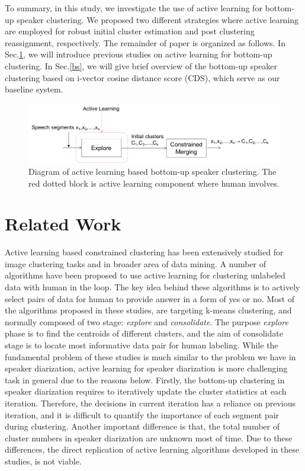 \documentclass[journal]{IEEEtran}
\begin{document}
To summary, in this study, we investigate the use of active learning for bottom-up speaker clustering. We proposed two different strategies where active learning are employed for robust initial cluster estimation and post clustering reassignment, respectively. The remainder of paper is organized as follows. In Sec.\ref{rw}, we will introduce previous studies on active learning for bottom-up clustering. In Sec.\ref{bs}, we will give brief overview of the bottom-up speaker clustering based on i-vector cosine distance score (CDS), which serve as our baseline system.   

\begin{figure}
	\includegraphics[width=\linewidth]{figs/flow5}
	\caption{Diagram of active learning based bottom-up speaker clustering. The red dotted block is active learning component where human involves.}
	\label{fig:flow1}
\end{figure}

\section{Related Work}
\label{rw}
Active learning based constrained clustering has been extensively studied for image clustering tasks and in broader area of data mining. A number of algorithms have been proposed to use active learning for clustering unlabeled data with human in the loop. The key idea behind these algorithms is to actively select pairs of data for human to provide answer in a form of yes or no. 
Most of the algorithms proposed in these studies, are targeting k-means clustering, and normally composed of two stage: \textit{explore} and \textit{consolidate}. The purpose \textit{explore} phase is to find the centroids of different clusters, and the aim of consolidate stage is to locate most informative data pair for human labeling. While the fundamental problem of these studies is much similar to the problem we have in speaker diarization, active learning for speaker diarization is more challenging task in general due to the reasons below. Firstly, the bottom-up clustering in speaker diarization requires to iteratively update the cluster statistics at each iteration. Therefore, the decisions in current iteration has a reliance on previous iteration, and it is difficult to quantify the importance of each segment pair during clustering. Another important difference is that, the total number of cluster numbers in speaker diarization are unknown most of time. Due to these differences, the direct replication of active learning algorithms developed in these studies, is not viable.
\end{document}

